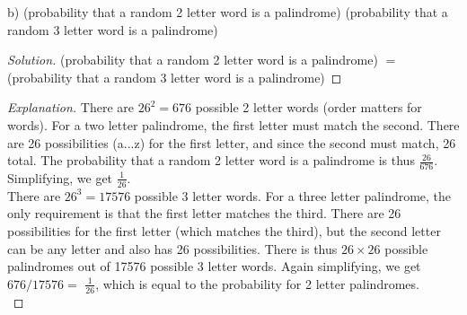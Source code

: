 \documentclass[10pt]{article}
\newenvironment{problem}[2][Problem]{\begin{trivlist}
\item[\hskip \labelsep {\bfseries #1}\hskip \labelsep {\bfseries #2.}]}{\end{trivlist}}
\begin{document}
\begin{problem}{1} 
(b) (probability that a random 2 letter word is a palindrome) \underline{\hspace{1cm}}
(probability that a random 3 letter word is a palindrome)
\end{problem}

\begin{proof}[Solution]

(probability that a random 2 letter word is a palindrome) $=$
(probability that a random 3 letter word is a palindrome)
\end{proof}

\begin{proof}[Explanation]
There are $26^2 = 676$ possible 2 letter words (order matters for words). For a two letter palindrome, the first letter must match the second. There are 26 possibilities (a...z) for the first letter, and since the second must match, 26 total. The probability that a random 2 letter word is a palindrome is thus \(\frac{26}{676}\). Simplifying, we get \(\frac{1}{26}\). \\

There are $26^3 = 17576$ possible 3 letter words. For a three letter palindrome, the only requirement is that the first letter matches the third. There are 26 possibilities for the first letter (which matches the third), but the second letter can be any letter and also has 26 possibilities. There is thus $26 \times 26$ possible palindromes out of 17576 possible 3 letter words. Again simplifying, we get $676 / 17576 = $ \(\frac{1}{26}\), which is equal to the probability for 2 letter palindromes. \\


\end{proof}
\end{document}
